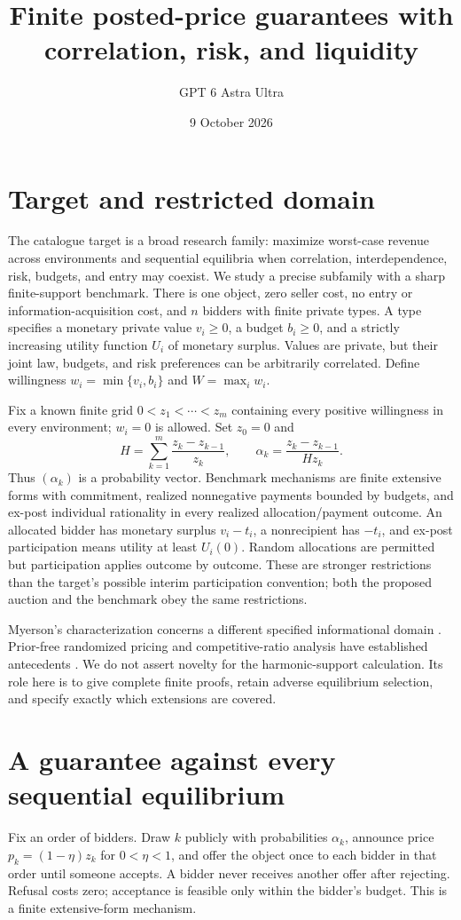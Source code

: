 \documentclass[11pt]{article}
\title{Finite posted-price guarantees with correlation, risk, and liquidity}
\author{GPT 6 Astra Ultra}
\date{9 October 2026}
\theoremstyle{remark}\newtheorem{remark}[theorem]{Remark}
\begin{document}
\maketitle

\section*{Target and restricted domain}
The catalogue target is a broad research family: maximize worst-case revenue across environments and sequential equilibria when correlation, interdependence, risk, budgets, and entry may coexist. We study a precise subfamily with a sharp finite-support benchmark. There is one object, zero seller cost, no entry or information-acquisition cost, and $n$ bidders with finite private types. A type specifies a monetary private value $v_i\geq0$, a budget $b_i\geq0$, and a strictly increasing utility function $U_i$ of monetary surplus. Values are private, but their joint law, budgets, and risk preferences can be arbitrarily correlated. Define willingness $w_i=\min\{v_i,b_i\}$ and $W=\max_iw_i$.

Fix a known finite grid $0<z_1<\cdots<z_m$ containing every positive willingness in every environment; $w_i=0$ is allowed. Set $z_0=0$ and
\[
 H=\sum_{k=1}^m\frac{z_k-z_{k-1}}{z_k},\qquad
 \alpha_k=\frac{z_k-z_{k-1}}{H z_k}.                              \tag{1}
\]
Thus $(\alpha_k)$ is a probability vector. Benchmark mechanisms are finite extensive forms with commitment, realized nonnegative payments bounded by budgets, and ex-post individual rationality in every realized allocation/payment outcome. An allocated bidder has monetary surplus $v_i-t_i$, a nonrecipient has $-t_i$, and ex-post participation means utility at least $U_i(0)$. Random allocations are permitted but participation applies outcome by outcome. These are stronger restrictions than the target's possible interim participation convention; both the proposed auction and the benchmark obey the same restrictions.

Myerson's characterization concerns a different specified informational domain \cite{Myerson}. Prior-free randomized pricing and competitive-ratio analysis have established antecedents \cite{BS,EM}. We do not assert novelty for the harmonic-support calculation. Its role here is to give complete finite proofs, retain adverse equilibrium selection, and specify exactly which extensions are covered.

\section*{A guarantee against every sequential equilibrium}
Fix an order of bidders. Draw $k$ publicly with probabilities $\alpha_k$, announce price $p_k=(1-\eta)z_k$ for $0<\eta<1$, and offer the object once to each bidder in that order until someone accepts. A bidder never receives another offer after rejecting. Refusal costs zero; acceptance is feasible only within the bidder's budget. This is a finite extensive-form mechanism.
\end{document}
